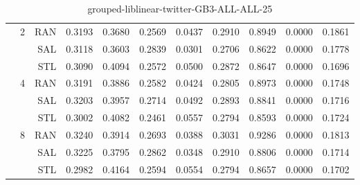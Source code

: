 \begin{center}
\begin{table}[htbp]
\begin{tabular}{ | r | r | r | r | r | r | r | r | r | r | r |}
 & \multirow{3}{*}{2} & RAN & 0.3193 & 0.3680 & 0.2569 & 0.0437 & 0.2910 & 0.8949 & 0.0000 & 0.1861\\ \cline{3-11}
 &   & SAL & 0.3118 & 0.3603 & 0.2839 & 0.0301 & 0.2706 & 0.8622 & 0.0000 & 0.1778\\ \cline{3-11}
 &   & STL & 0.3090 & 0.4094 & 0.2572 & 0.0500 & 0.2872 & 0.8647 & 0.0000 & 0.1696\\ \cline{2-11}
 & \multirow{3}{*}{4} & RAN & 0.3191 & 0.3886 & 0.2582 & 0.0424 & 0.2805 & 0.8973 & 0.0000 & 0.1748\\ \cline{3-11}
 &   & SAL & 0.3203 & 0.3957 & 0.2714 & 0.0492 & 0.2893 & 0.8841 & 0.0000 & 0.1716\\ \cline{3-11}
 &   & STL & 0.3002 & 0.4082 & 0.2461 & 0.0557 & 0.2794 & 0.8593 & 0.0000 & 0.1724\\ \cline{2-11}
 & \multirow{3}{*}{8} & RAN & 0.3240 & 0.3914 & 0.2693 & 0.0388 & 0.3031 & 0.9286 & 0.0000 & 0.1813\\ \cline{3-11}
 &   & SAL & 0.3225 & 0.3795 & 0.2862 & 0.0348 & 0.2910 & 0.8806 & 0.0000 & 0.1714\\ \cline{3-11}
 &   & STL & 0.2982 & 0.4164 & 0.2594 & 0.0554 & 0.2794 & 0.8657 & 0.0000 & 0.1702\\ \cline{2-11}
\hline
\end{tabular}
\caption{grouped-liblinear-twitter-GB3-ALL-ALL-25}
\end{table}
\end{center}

